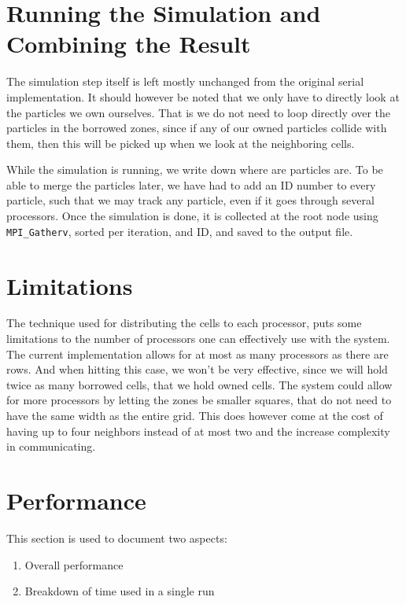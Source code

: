 \section{Running the Simulation and Combining the Result}

The simulation step itself is left mostly unchanged from the original serial implementation. It should however be noted
that we only have to directly look at the particles we own ourselves. That is we do not need to loop directly over the
particles in the borrowed zones, since if any of our owned particles collide with them, then this will be picked up when
we look at the neighboring cells.

While the simulation is running, we write down where are particles are. To be able to merge the particles later, we have
had to add an ID number to every particle, such that we may track any particle, even if it goes through several
processors. Once the simulation is done, it is collected at the root node using \verb!MPI_Gatherv!, sorted per
iteration, and ID, and saved to the output file.

\section{Limitations}

The technique used for distributing the cells to each processor, puts some limitations to the number of processors one
can effectively use with the system. The current implementation allows for at most as many processors as there are rows.
And when hitting this case, we won't be very effective, since we will hold twice as many borrowed cells, that we hold
owned cells. The system could allow for more processors by letting the zones be smaller squares, that do not need to
have the same width as the entire grid. This does however come at the cost of having up to four neighbors instead of at
most two and the increase complexity in communicating.

\section{Performance}
This section is used to document two aspects:

\begin{enumerate}
  \item Overall performance 
  \item Breakdown of time used in a single run
\end{enumerate}

